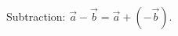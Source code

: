 \documentclass[preview]{standalone}
\begin{document}
\begin{center}
Subtraction: \(\vec a-\vec b=\vec a+(-\vec b)\).
\end{center}
\end{document}
